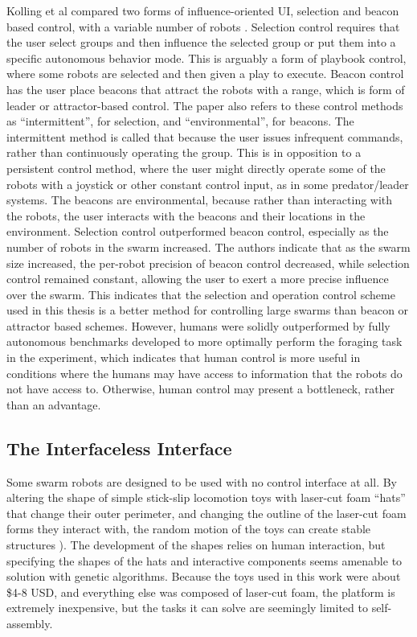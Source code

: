 Kolling et al compared two forms of influence-oriented UI, selection and beacon based control, with a variable number of robots \citep{kolling2013human}. 
Selection control requires that the user select groups and then influence the selected group or put them into a specific autonomous behavior mode. 
This is arguably a form of playbook control, where some robots are selected and then given a play to execute. 
Beacon control has the user place beacons that attract the robots with a range, which is form of leader or attractor-based control. 
The paper also refers to these control methods as ``intermittent'', for selection, and ``environmental'', for beacons. 
The intermittent method is called that because the user issues infrequent commands, rather than continuously operating the group. 
This is in opposition to a persistent control method, where the user might directly operate some of the robots with a joystick or other constant control input, as in some predator/leader systems. 
The beacons are environmental, because rather than interacting with the robots, the user interacts with the beacons and their locations in the environment. 
Selection control outperformed beacon control, especially as the number of robots in the swarm increased. 
The authors indicate that as the swarm size increased, the per-robot precision of beacon control decreased, while selection control remained constant, allowing the user to exert a more precise influence over the swarm. 
This indicates that the selection and operation control scheme used in this thesis is a better method for controlling large swarms than beacon or attractor based schemes. 
However, humans were solidly outperformed by fully autonomous benchmarks developed to more optimally perform the foraging task in the experiment, which indicates that human control is more useful in conditions where the humans may have access to information that the robots do not have access to. 
Otherwise, human control may present a bottleneck, rather than an advantage. 

\subsection{The Interfaceless Interface} \label{section:The_Interfaceless_Interface}

Some swarm robots are designed to be used with no control interface at all.
By altering the shape of simple stick-slip locomotion toys with laser-cut foam ``hats'' that change their outer perimeter, and changing the outline of the laser-cut foam forms they interact with, the random motion of the toys can create stable structures \citep{andreen2016emergent}).
The development of the shapes relies on human interaction, but specifying the shapes of the hats and interactive components seems amenable to solution with genetic algorithms. 
Because the toys used in this work were about \$4-8 USD, and everything else was composed of laser-cut foam, the platform is extremely inexpensive, but the tasks it can solve are seemingly limited to self-assembly. 

